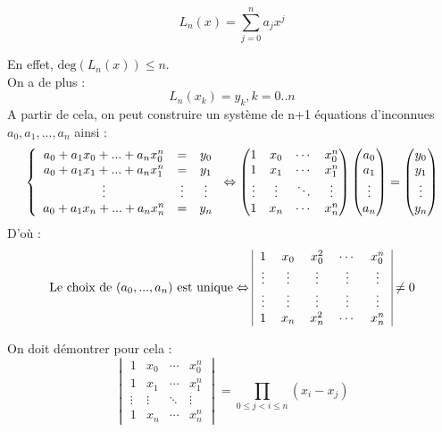 \begin{dem}
\[L_n(x)=\sum_{j=0}^n a_j x^j\]

En effet, $\text{deg}(L_n(x))\leq n$.\\
On a de plus :
\[L_n(x_k)=y_k, k=0..n\]
A partir de cela, on peut construire un système de n+1 équations d'inconnues $a_0,a_1,...,a_n$ ainsi :
\[\left\{
\begin{array}{c c c}
a_0 + a_1 x_0 + ... + a_n x_0^n &=& y_0 \\
a_0 + a_1 x_1 + ... + a_n x_1^n &=& y_1 \\
\vdots &\vdots& \vdots \\
a_0 + a_1 x_n + ... + a_n x_n^n &=& y_n
\end{array}
\right.
 \Leftrightarrow
\begin{pmatrix}
  1    &   x_0   &   \cdots   &   x_0^n  \\
  1    &   x_1   &   \cdots   &   x_1^n  \\
\vdots &  \vdots &   \ddots   &   \vdots \\
  1    &   x_n   &   \cdots   &   x_n^n 
\end{pmatrix}
\begin{pmatrix}
a_0 \\
a_1 \\
\vdots \\
a_n
\end{pmatrix}
=
\begin{pmatrix}
y_0 \\
y_1 \\
\vdots \\
y_n
\end{pmatrix}
\]
D'où : 
\[
\text{Le choix de } (a_0,...,a_n) \text{ est unique} \Leftrightarrow \begin{tabular}{|c c c c c|}
1 & $x_0$ & $x_0^2$ & $\cdots$ & $x_0^n$\\
\vdots & \vdots & \vdots & \vdots & \vdots\\
\vdots & \vdots & \vdots & \vdots & \vdots\\
1 & $x_n$ & $x_n^2$ & $\cdots$ & $x_n^n$ \\
\end{tabular} \neq 0 \]

On doit démontrer pour cela : \[\begin{vmatrix}
1 & x_0 & \cdots & x_0^n \\
1 & x_1 & \cdots & x_1^n \\
\vdots & \vdots & \ddots & \vdots \\
1 & x_n & \cdots & x_n^n 
\end{vmatrix}
 = \prod_{0\leq j<i \leq n} (x_i - x_j)\]


\end{dem}
